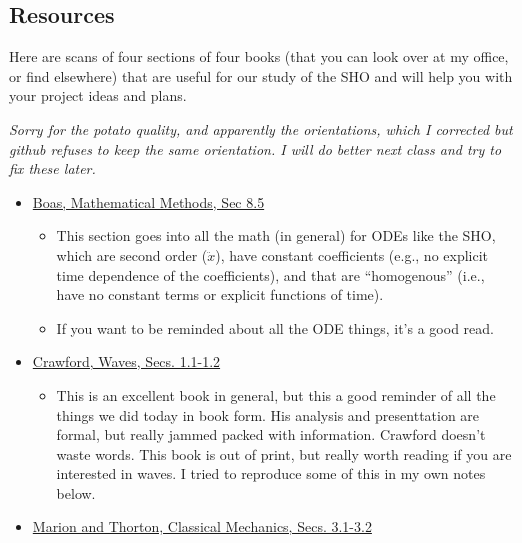 \subsection{Resources}\label{resources}

Here are scans of four sections of four books (that you can look over at
my office, or find elsewhere) that are useful for our study of the SHO
and will help you with your project ideas and plans.

\emph{Sorry for the potato quality, and apparently the orientations,
which I corrected but github refuses to keep the same orientation. I
will do better next class and try to fix these later.}

\begin{itemize}
\tightlist
\item
  \href{https://github.com/dannycab/phy415msu/blob/main/MMIPbook/assets/pdfs/scans/Boas_ODEs_8.5.pdf}{Boas,
  Mathematical Methods, Sec 8.5}

  \begin{itemize}
  \tightlist
  \item
    This section goes into all the math (in general) for ODEs like the
    SHO, which are second order (\(\ddot{x}\)), have constant
    coefficients (e.g., no explicit time dependence of the
    coefficients), and that are ``homogenous'' (i.e., have no constant
    terms or explicit functions of time).
  \item
    If you want to be reminded about all the ODE things, it's a good
    read.
  \end{itemize}
\item
  \href{https://github.com/dannycab/phy415msu/blob/main/MMIPbook/assets/pdfs/scans/Crawford_Waves_1.1-1.2.pdf}{Crawford,
  Waves, Secs. 1.1-1.2}

  \begin{itemize}
  \tightlist
  \item
    This is an excellent book in general, but this a good reminder of
    all the things we did today in book form. His analysis and
    presenttation are formal, but really jammed packed with information.
    Crawford doesn't waste words. This book is out of print, but really
    worth reading if you are interested in waves. I tried to reproduce
    some of this in my own notes below.
  \end{itemize}
\item
  \href{https://github.com/dannycab/phy415msu/blob/main/MMIPbook/assets/pdfs/scans/Marion_Thornton_Oscillations_3.1-3.2.pdf}{Marion
  and Thorton, Classical Mechanics, Secs. 3.1-3.2}


\end{itemize}
